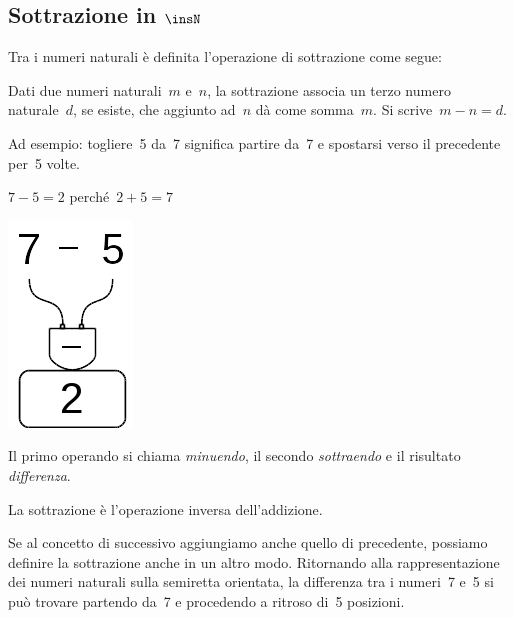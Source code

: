 \subsection{Sottrazione in \(\insN\)}

Tra i numeri naturali è definita l'operazione di sottrazione come segue:

\begin{definizione}
Dati due numeri naturali~\(m\) e~\(n\), la sottrazione associa un terzo numero 
naturale~\(d\), se esiste, che aggiunto ad~\(n\) dà come somma~\(m\).
Si scrive~\(m - n = d\).
\end{definizione}

Ad esempio: togliere~5 da~7 significa partire da~7 e spostarsi verso il 
precedente per~5 volte.

\begin{minipage}{0.80\textwidth}
 \centering
 \(7-5=2\) perché~\(2+5=7\)

 
\end{minipage}%
\begin{minipage}{0.15\textwidth}
 \centering
\begin{inaccessibleblock}
 \includegraphics[scale=0.35]{img/op_sot.png}
\end{inaccessibleblock}
\end{minipage}%

Il primo operando si chiama \emph{minuendo}, il secondo \emph{sottraendo} e 
il risultato \emph{differenza}.

La sottrazione è l'operazione inversa dell'addizione.

Se al concetto di successivo aggiungiamo anche quello di precedente, 
possiamo definire la sottrazione anche in un altro modo.
Ritornando alla rappresentazione dei numeri naturali sulla semiretta 
orientata, la differenza tra i numeri~7 e~5 si può trovare partendo da~7 e 
procedendo a ritroso di~5 posizioni.

